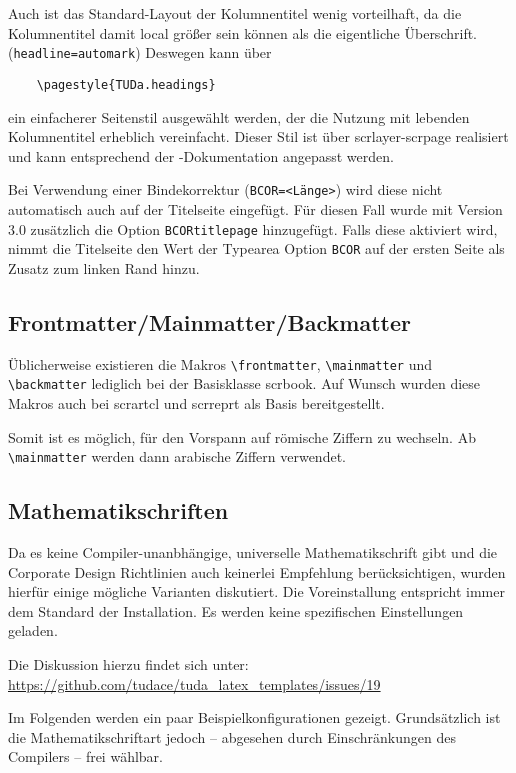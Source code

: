 \documentclass[
	ngerman,
	accentcolor=9c,%
	]{tudapub}
\let\code\texttt
\let\pck\textsf
\let\cls\textsf
\begin{document}
Auch ist das Standard-Layout der Kolumnentitel wenig vorteilhaft, da die Kolumnentitel damit local größer sein können als die eigentliche Überschrift. (\code{headline=automark})
Deswegen kann über
\begin{verbatim}
	\pagestyle{TUDa.headings}
\end{verbatim}
ein einfacherer Seitenstil ausgewählt werden, der die Nutzung mit lebenden Kolumnentitel erheblich vereinfacht. Dieser Stil ist über \pck{scrlayer-scrpage} realisiert und kann entsprechend der \KOMAScript{}-Dokumentation angepasst werden.

Bei Verwendung einer Bindekorrektur (\code{BCOR=<Länge>}) wird diese nicht automatisch auch auf der Titelseite eingefügt. Für diesen Fall wurde mit Version 3.0 zusätzlich die Option \code{BCORtitlepage} hinzugefügt. Falls diese aktiviert wird, nimmt die Titelseite den Wert der Typearea Option \code{BCOR} auf der ersten Seite als Zusatz zum linken Rand hinzu.


\subsection{Frontmatter/Mainmatter/Backmatter}
Üblicherweise existieren die Makros \verb+\frontmatter+, \verb+\mainmatter+ und \verb+\backmatter+ lediglich bei der Basisklasse \cls{scrbook}.
Auf Wunsch wurden diese Makros auch bei \cls{scrartcl} und \cls{scrreprt} als Basis bereitgestellt.

Somit ist es möglich, für den Vorspann auf römische Ziffern zu wechseln. Ab \verb+\mainmatter+ werden dann arabische Ziffern verwendet.


\subsection{Mathematikschriften}
Da es keine Compiler-unanbhängige, universelle Mathematikschrift gibt und die Corporate Design Richtlinien auch keinerlei Empfehlung berücksichtigen, wurden hierfür einige mögliche Varianten diskutiert. Die Voreinstallung entspricht immer dem Standard der Installation. Es werden keine spezifischen Einstellungen geladen.

Die Diskussion hierzu findet sich unter:\\
\url{https://github.com/tudace/tuda_latex_templates/issues/19}

Im Folgenden werden ein paar Beispielkonfigurationen gezeigt. Grundsätzlich ist die Mathematikschriftart jedoch -- abgesehen durch Einschränkungen des Compilers -- frei wählbar.
\end{document}
